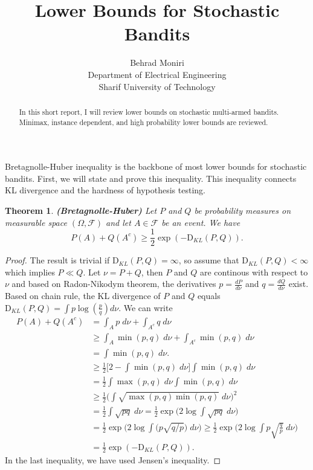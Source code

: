 \documentclass[]{article}
\title{Lower Bounds for Stochastic Bandits}
\author{Behrad Moniri\\{\small Department of Electrical Engineering}\\{\small Sharif University of Technology}}
\date{}
\newtheorem{theorem}{Theorem}
\newcommand{\KL}{\mathrm{D}_{KL}}
\begin{document}
\maketitle

\begin{abstract}
In this short report, I will review lower bounds on stochastic multi-armed bandits. Minimax, instance dependent, and high probability lower bounds are reviewed.
\end{abstract}

Bretagnolle-Huber inequality is the backbone of most lower bounds for stochastic bandits. First, we will state and prove this inequality. This inequality connects KL divergence and the hardness of hypothesis testing.


\begin{theorem}
\textbf{(Bretagnolle-Huber)} Let $P$ and $Q$ be probability measures on measurable space $(\Omega, \mathcal{F})$ and let $A \in \mathcal{F}$ be an event. We have
\begin{equation}
P(A) + Q(A^c) \geq \frac{1}{2} \exp(-\KL(P,Q)).
\end{equation}
\end{theorem}

\begin{proof}
The result is trivial if $\KL(P, Q) = \infty$, so assume that $\KL(P, Q) < \infty$ which implies $P\ll Q$. Let $\nu = P + Q$, then $P$ and $Q$ are continous with respect to $\nu$ and based on Radon-Nikodym theorem, the derivatives $p = \frac{dP}{d\nu}$ and  $q = \frac{dQ}{d\nu}$ exist. Based on chain rule, the KL divergence of $P$ and $Q$ equals $\KL(P, Q) = \int p \log(\frac{p}{q}) d\nu$. We can write
\begin{align}
P(A) + Q(A^c) &= \int_A p \; d\nu + \int_{A^c} q \; d\nu\\
&\geq \int_A \min(p, q) \; d\nu + \int_{A^c} \min(p, q) \; d\nu\\
&= \int \min(p, q) \; d\nu.\\
&\geq \frac{1}{2} \Big[2 - \int \min(p, q) \; d\nu\Big] \int \min(p, q) \; d\nu\\
&= \frac{1}{2} \int \max(p, q) \; d\nu \int \min(p, q) \; d\nu\\
&\geq  \frac{1}{2} \Big(\int \sqrt{\max(p, q)\min(p, q)} \; d\nu\Big)^2\\
&= \frac{1}{2}\int \sqrt{pq} \; d\nu = \frac{1}{2}\exp\Big(2\log \int \sqrt{pq} \; d\nu\Big)\\
&=\frac{1}{2}\exp\Big(2\log\int\big(p\sqrt{q/p}\big) \; d\nu\Big) \geq \frac{1}{2}\exp\Big(2\log \int p \sqrt{\frac{q}{p}} \; d\nu\Big)\\
&= \frac{1}{2}\exp(-\KL(P, Q)).
\end{align}
In the last inequality, we have used Jensen's inequality.
\end{proof}
\end{document}

